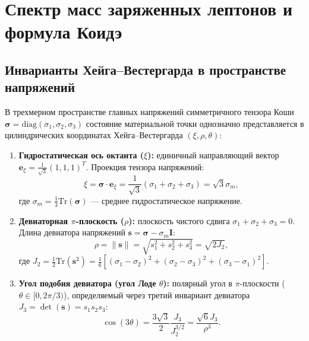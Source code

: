 \documentclass[11pt,a4paper]{article}
\theoremstyle{definition}
\theoremstyle{remark}
\begin{document}

\section{Спектр масс заряженных лептонов и формула Коидэ}
\label{sec:leptons}

\subsection{Инварианты Хейга--Вестергарда в пространстве напряжений}
В трехмерном пространстве главных напряжений симметричного тензора Коши $\boldsymbol{\sigma} = \mathrm{diag}(\sigma_1, \sigma_2, \sigma_3)$ состояние материальной точки однозначно представляется в цилиндрических координатах Хейга--Вестергарда $(\xi, \rho, \theta)$:
\begin{enumerate}
    \item \textbf{Гидростатическая ось октанта ($\xi$):} единичный направляющий вектор $\mathbf{e}_\xi = \frac{1}{\sqrt{3}}(1, 1, 1)^T$. Проекция тензора напряжений:
    \begin{equation}
        \xi = \boldsymbol{\sigma} \cdot \mathbf{e}_\xi = \frac{1}{\sqrt{3}}(\sigma_1 + \sigma_2 + \sigma_3) = \sqrt{3} \sigma_m,
    \end{equation}
    где $\sigma_m = \frac{1}{3}\mathrm{Tr}(\boldsymbol{\sigma})$ --- среднее гидростатическое напряжение.
    
    \item \textbf{Девиаторная $\pi$-плоскость ($\rho$):} плоскость чистого сдвига $\sigma_1 + \sigma_2 + \sigma_3 = 0$. Длина девиатора напряжений $\mathbf{s} = \boldsymbol{\sigma} - \sigma_m \mathbf{I}$:
    \begin{equation}
        \rho = \|\mathbf{s}\| = \sqrt{s_1^2 + s_2^2 + s_3^2} = \sqrt{2 J_2},
    \end{equation}
    где $J_2 = \frac{1}{2}\mathrm{Tr}(\mathbf{s}^2) = \frac{1}{6}\left[ (\sigma_1 - \sigma_2)^2 + (\sigma_2 - \sigma_3)^2 + (\sigma_3 - \sigma_1)^2 \right]$.
    
    \item \textbf{Угол подобия девиатора (угол Лоде $\theta$):} полярный угол в $\pi$-плоскости ($\theta \in [0, 2\pi/3)$), определяемый через третий инвариант девиатора $J_3 = \det(\mathbf{s}) = s_1 s_2 s_3$:
    \begin{equation}
        \cos(3\theta) = \frac{3\sqrt{3}}{2} \frac{J_3}{J_2^{3/2}} = \frac{\sqrt{6} J_3}{\rho^3}.
    \end{equation}
\end{enumerate}
\end{document}
